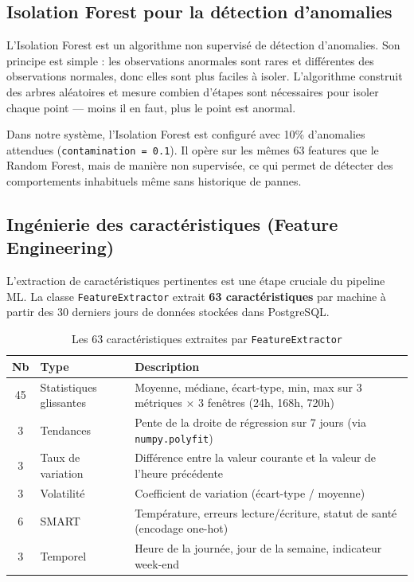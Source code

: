 \subsection{Isolation Forest pour la détection d'anomalies}

L'Isolation Forest \cite{liu2008isolation} est un algorithme non supervisé de
détection d'anomalies. Son principe est simple : les observations anormales sont
rares et différentes des observations normales, donc elles sont plus faciles à
isoler. L'algorithme construit des arbres aléatoires et mesure combien d'étapes
sont nécessaires pour isoler chaque point — moins il en faut, plus le point est
anormal.

Dans notre système, l'Isolation Forest est configuré avec 10\% d'anomalies
attendues (\texttt{contamination = 0.1}). Il opère sur les mêmes 63 features que
le Random Forest, mais de manière non supervisée, ce qui permet de détecter des
comportements inhabituels même sans historique de pannes.

\subsection{Ingénierie des caractéristiques (Feature Engineering)}

L'extraction de caractéristiques pertinentes est une étape cruciale du pipeline ML.
La classe \texttt{FeatureExtractor} extrait \textbf{63 caractéristiques} par machine
à partir des 30 derniers jours de données stockées dans PostgreSQL.

\begin{table}[H]
\centering
\caption{Les 63 caractéristiques extraites par \texttt{FeatureExtractor}}
\begin{tabularx}{\textwidth}{|c|l|X|}
\hline
\rowcolor{lightblue}
\textbf{Nb} & \textbf{Type} & \textbf{Description} \\
\hline
45 & Statistiques glissantes & Moyenne, médiane, écart-type, min, max sur 3 métriques
     $\times$ 3 fenêtres (24h, 168h, 720h) \\
\hline
3  & Tendances & Pente de la droite de régression sur 7 jours (via \texttt{numpy.polyfit}) \\
\hline
3  & Taux de variation & Différence entre la valeur courante et la valeur de l'heure précédente \\
\hline
3  & Volatilité & Coefficient de variation (écart-type / moyenne) \\
\hline
6  & SMART & Température, erreurs lecture/écriture, statut de santé (encodage one-hot) \\
\hline
3  & Temporel & Heure de la journée, jour de la semaine, indicateur week-end \\
\hline
\end{tabularx}
\end{table}

